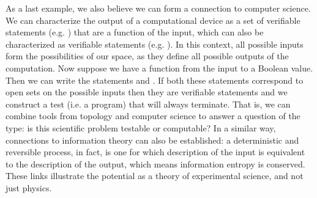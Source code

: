 \documentclass[twocolumn]{article}
\begin{document}
As a last example, we also believe we can form a connection to computer science. We can characterize the output of a computational device as a set of verifiable statements (e.g. ) that are a function of the input, which can also be characterized as verifiable statements (e.g. ). In this context, all possible inputs form the possibilities of our space, as they define all possible outputs of the computation. Now suppose we have a function from the input to a Boolean value. Then we can write the statements  and . If both these statements correspond to open sets on the possible inputs then they are verifiable statements and we construct a test (i.e. a program) that will always terminate. That is, we can combine tools from topology and computer science to answer a question of the type: is this scientific problem testable or computable? In a similar way, connections to information theory can also be established: a deterministic and reversible process, in fact, is one for which description of the input is equivalent to the description of the output, which means information entropy is conserved. These links illustrate the potential as a theory of experimental science, and not just physics.
\end{document}
